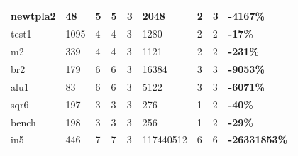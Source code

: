 \documentclass[
]{book}
\begin{document}
\begin{table}
\begin{tabular}{|l|l|l|l|l|l|l|l|l|}
\hline
newtpla2             & 48                                                      & 5                     & 5                   & 3                       & 2048                                                     & 2                     & 3                   & \textbf{-4167\% }      \\ 
\hline
test1                & 1095                                                    & 4                     & 4                   & 3                       & 1280                                                     & 2                     & 2                   & \textbf{-17\% }        \\ 
\hline
m2                   & 339                                                     & 4                     & 4                   & 3                       & 1121                                                     & 2                     & 2                   & \textbf{-231\% }       \\ 
\hline
br2                  & 179                                                     & 6                     & 6                   & 3                       & 16384                                                    & 3                     & 3                   & \textbf{-9053\% }      \\ 
\hline
alu1                 & 83                                                      & 6                     & 6                   & 3                       & 5122                                                     & 3                     & 3                   & \textbf{-6071\% }      \\ 
\hline
sqr6                 & 197                                                     & 3                     & 3                   & 3                       & 276                                                      & 1                     & 2                   & \textbf{-40\% }        \\ 
\hline
bench                & 198                                                     & 3                     & 3                   & 3                       & 256                                                      & 1                     & 2                   & \textbf{-29\% }        \\ 
\hline
in5                  & 446                                                     & 7                     & 7                   & 3                       & 117440512                                                & 6                     & 6                   & \textbf{-26331853\% }  \\ 

\end{tabular}
\end{table}
\end{document}

